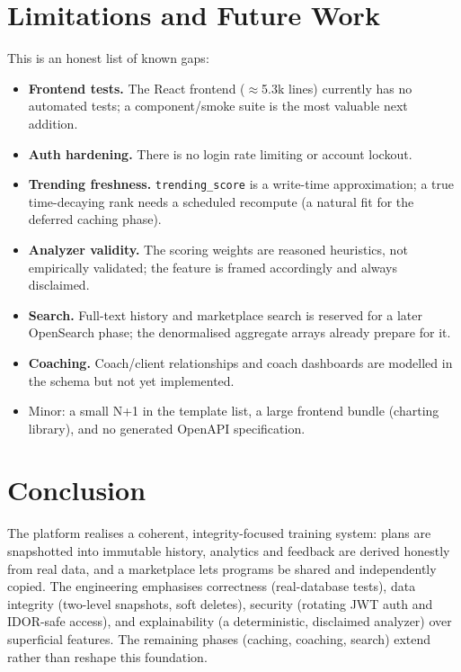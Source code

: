 \documentclass[11pt,a4paper]{article}
\begin{document}
\section{Limitations and Future Work}
This is an honest list of known gaps:
\begin{itemize}[noitemsep]
  \item \textbf{Frontend tests.} The React frontend (\(\approx\)5.3k lines) currently has no automated
        tests; a component/smoke suite is the most valuable next addition.
  \item \textbf{Auth hardening.} There is no login rate limiting or account lockout.
  \item \textbf{Trending freshness.} \verb|trending_score| is a write-time approximation; a true
        time-decaying rank needs a scheduled recompute (a natural fit for the deferred caching phase).
  \item \textbf{Analyzer validity.} The scoring weights are reasoned heuristics, not empirically
        validated; the feature is framed accordingly and always disclaimed.
  \item \textbf{Search.} Full-text history and marketplace search is reserved for a later
        OpenSearch phase; the denormalised aggregate arrays already prepare for it.
  \item \textbf{Coaching.} Coach/client relationships and coach dashboards are modelled in the
        schema but not yet implemented.
  \item Minor: a small N+1 in the template list, a large frontend bundle (charting library), and
        no generated OpenAPI specification.
\end{itemize}

\section{Conclusion}
The platform realises a coherent, integrity-focused training system: plans are snapshotted into
immutable history, analytics and feedback are derived honestly from real data, and a marketplace
lets programs be shared and independently copied. The engineering emphasises correctness
(real-database tests), data integrity (two-level snapshots, soft deletes), security (rotating JWT
auth and IDOR-safe access), and explainability (a deterministic, disclaimed analyzer) over
superficial features. The remaining phases (caching, coaching, search) extend rather than reshape
this foundation.
\end{document}
